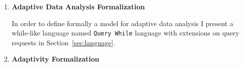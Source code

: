 \begin{enumerate}
 \item
 \textbf{Adaptive Data Analysis Formalization}

In order to define formally a model for adaptive data analysis
 I present a while-like language named {\tt Query While} language with extensions on query requests in Section~\ref{sec:language}.

\item 
\textbf{Adaptivity Formalization}


\end{enumerate}
